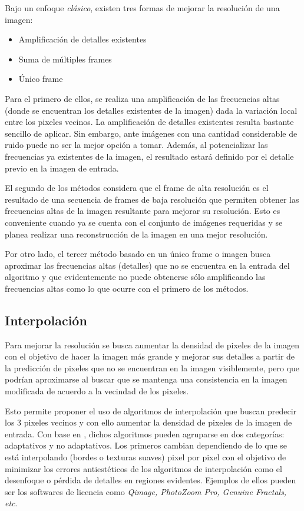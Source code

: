 \noindent
Bajo un enfoque \emph{clásico}, existen tres formas de mejorar la resolución 
de una imagen:

\begin{itemize}
    \item Amplificación de detalles existentes
    \item Suma de múltiples frames
    \item Único frame
\end{itemize}

Para el primero de ellos, se realiza una amplificación de las frecuencias altas
(donde se encuentran los detalles existentes de la imagen) dada la variación local
entre los pixeles vecinos. 
La amplificación de detalles existentes resulta bastante 
sencillo de aplicar. Sin embargo, ante imágenes con una cantidad considerable de
ruido puede no ser la mejor opción a tomar. Además, al potencializar las 
frecuencias ya existentes de la imagen, el resultado estará definido por el detalle
previo en la imagen de entrada. 

El segundo de los métodos considera que el frame de alta resolución es el resultado
de una secuencia de frames de baja resolución que permiten obtener las frecuencias 
altas de la imagen resultante para mejorar su resolución. Esto es conveniente cuando
ya se cuenta con el conjunto de imágenes requeridas y se planea realizar una 
reconstrucción de la imagen en una mejor resolución.

Por otro lado, el tercer método basado en un único frame o imagen busca aproximar las
frecuencias altas (detalles) que no se encuentra en la entrada del algoritmo y que evidentemente
no puede obtenerse sólo amplificando las frecuencias altas como lo que ocurre con 
el primero de los métodos. 

\subsection{Interpolación}
\noindent
Para mejorar la resolución se busca aumentar la densidad de pixeles de la imagen con el objetivo
de hacer la imagen más grande y mejorar sus detalles a partir de la predicción de 
pixeles que no se encuentran en la imagen visiblemente, pero que podrían aproximarse
al buscar que se mantenga una consistencia en la imagen modificada de acuerdo a la
vecindad de los pixeles. 

Esto permite proponer el uso de algoritmos de interpolación que buscan predecir los  3
pixeles vecinos y con ello aumentar la densidad de pixeles de la imagen de entrada. 
Con base en \cite{interpolation_cambridge}, dichos algoritmos pueden agruparse en dos
categorías: adaptativos y no adaptativos. Los primeros cambian dependiendo de lo que
se está interpolando (bordes o texturas suaves) pixel por pixel con el objetivo de
minimizar los errores antiestéticos de los algoritmos de interpolación como el
desenfoque o pérdida de detalles en regiones evidentes. Ejemplos de ellos pueden
ser los softwares de licencia como \emph{Qimage, PhotoZoom Pro, Genuine Fractals, etc}. 

